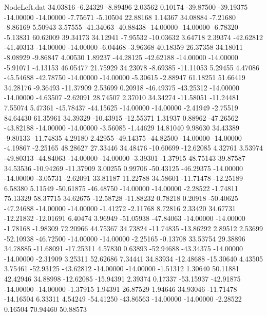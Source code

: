 \begin{filecontents}{NodeLeft.dat}
  34.03816   -6.24329   -8.89496     2.03562    0.10174  -39.87500  -39.19375  -14.00000  -14.00000   -7.75671   -5.10504   22.88168    1.14367
  34.08884   -7.21680   -8.86169     5.50943    3.57555  -41.34063  -40.88438  -14.00000  -14.00000   -6.78320   -5.13831   60.62009   39.34173
  34.12941   -7.95532  -10.03632     3.64718    2.39374  -42.62812  -41.40313  -14.00000  -14.00000   -6.04468   -3.96368   40.18359   26.37358
  34.18011   -8.08929   -9.86847     4.00530    1.89237  -44.28125  -42.62188  -14.00000  -14.00000   -5.91071   -4.13153   46.05477   21.75929
  34.23078   -8.69385  -11.11053     5.29455    4.47086  -45.54688  -42.78750  -14.00000  -14.00000   -5.30615   -2.88947   61.18251   51.66419
  34.28176   -9.36493  -11.37909     2.53699    0.20918  -46.49375  -43.25312  -14.00000  -14.00000   -4.63507   -2.62091   28.74507    2.37010
  34.34274  -11.58051  -11.24481     7.55074    5.47361  -45.78437  -44.15625  -14.00000  -14.00000   -2.41949   -2.75519   84.64430   61.35961
  34.39329  -10.43915  -12.55371     1.31937    0.88962  -47.26562  -43.82188  -14.00000  -14.00000   -3.56085   -1.44629   14.81040    9.98630
  34.43389   -9.80133  -11.74835     4.29180    2.42955  -49.14375  -44.82500  -14.00000  -14.00000   -4.19867   -2.25165   48.28627   27.33446
  34.48476  -10.60699  -12.62085     4.32761    3.53974  -49.80313  -44.84063  -14.00000  -14.00000   -3.39301   -1.37915   48.75143   39.87587
  34.53536  -10.94269  -11.37909     3.00255    0.99706  -50.43125  -46.29375  -14.00000  -14.00000   -3.05731   -2.62091   33.81187   11.22788
  34.58601  -11.71478  -12.25189     6.58380    5.11549  -50.61875  -46.48750  -14.00000  -14.00000   -2.28522   -1.74811   75.13329   58.37715
  34.62675  -12.58728  -11.88232     0.78218    0.20918  -50.40625  -47.24688  -14.00000  -14.00000   -1.41272   -2.11768    8.72816    2.33420
  34.67731  -12.21832  -12.01691     6.40474    3.96949  -51.05938  -47.84063  -14.00000  -14.00000   -1.78168   -1.98309   72.20966   44.75367
  34.73824  -11.74835  -13.86292     2.89512    2.53699  -52.10938  -46.72500  -14.00000  -14.00000   -2.25165   -0.13708   33.53754   29.38896
  34.78885  -11.68091  -17.25311     4.57830    0.63893  -52.94688  -43.34375  -14.00000  -14.00000   -2.31909    3.25311   52.62686    7.34441
  34.83934  -12.48688  -15.30640     4.43505    3.75461  -52.93125  -43.62812  -14.00000  -14.00000   -1.51312    1.30640   50.11881   42.42946
  34.88998  -12.62085  -15.94391     2.39374    0.17337  -53.15937  -42.91875  -14.00000  -14.00000   -1.37915    1.94391   26.87529    1.94646
  34.93046  -11.71478  -14.16504     6.33311    4.54249  -54.41250  -43.86563  -14.00000  -14.00000   -2.28522    0.16504   70.94460   50.88573

\end{filecontents}
